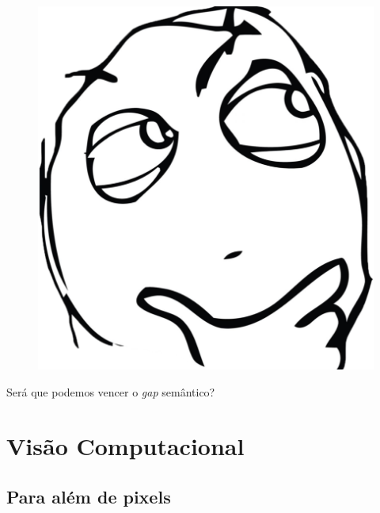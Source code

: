 \documentclass{beamer}
\begin{document}
        {
        \color{white}
        \begin{frame}[plain]
            \begin{center}
            \Large
            
            \begin{figure}
                \centering
                \includegraphics[scale=0.18]{img/doubt.png}
            \end{figure}
            Será que podemos vencer o \emph{gap} semântico?
        
            \end{center}
        \end{frame}
        }

\section{Visão Computacional}

\subsection{Para além de pixels}
\end{document}
